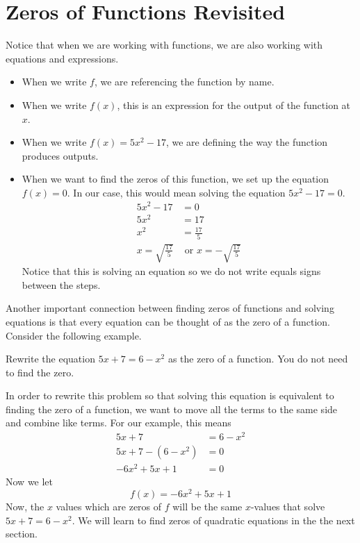 \documentclass{ximera}
\begin{document}
\section{Zeros of Functions Revisited}
Notice that when we are working with functions, we are also working with equations and expressions.  
\begin{itemize}
\item When we write $f$, we are referencing the function by name.  
\item When we write $f(x)$, this is an expression for the output of the function at $x$.
\item When we write $f(x)=5x^2-17$, we are defining the way the function produces outputs.
\item When we want to find the zeros of this function, we set up the equation $f(x)=0$.  In our case, this would mean solving the equation $5x^2-17=0$.
\begin{align*}
5x^2-17&=0\\
5x^2&=17\\
x^2&=\frac{17}{5}\\
x=\sqrt{\frac{17}{5}} &\text{  or  }  x=-\sqrt{\frac{17}{5}}
\end{align*}  
Notice that this is solving an equation so we do not write equals signs between the steps.
\end{itemize}

Another important connection between finding zeros of functions and solving equations is that every equation can be thought of as the zero of a function.  Consider the following example.

\begin{example}
Rewrite the equation $5x+7=6-x^2$ as the zero of a function.  You do not need to find the zero.

\begin{explanation}
In order to rewrite this problem so that solving this equation is equivalent to finding the zero of a function, we want to move all the terms to the same side and combine like terms.  For our example, this means
\begin{align*}
5x+7&=6-x^2\\
5x+7 -(6-x^2)&=0\\
-6x^2+5x+1&=0
\end{align*}
Now we let
$$f(x)=-6x^2+5x+1$$
Now, the $x$ values which are zeros of $f$ will be the same $x$-values that solve $5x+7=6-x^2$.  We will learn to find zeros of quadratic equations in the the next section.
\end{explanation}
\end{example}
\end{document}
